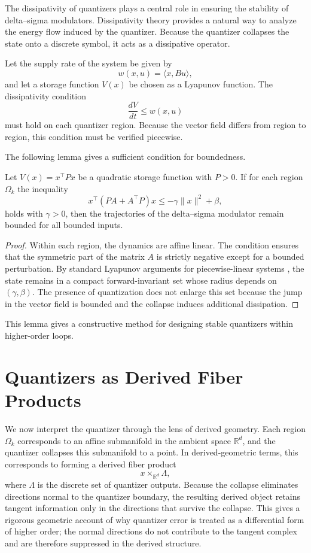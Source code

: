 The dissipativity of quantizers plays a central role in ensuring the stability of delta--sigma modulators. Dissipativity theory \parencite{Willems1972Dissipative,Vidyasagar1993NonlinearSystems} provides a natural way to analyze the energy flow induced by the quantizer. Because the quantizer collapses the state onto a discrete symbol, it acts as a dissipative operator.

Let the supply rate of the system be given by
\[
w(x,u) = \langle x, Bu \rangle,
\]
and let a storage function $V(x)$ be chosen as a Lyapunov function. The dissipativity condition
\[
\frac{dV}{dt} \leq w(x,u)
\]
must hold on each quantizer region. Because the vector field differs from region to region, this condition must be verified piecewise.

The following lemma gives a sufficient condition for boundedness.

\begin{lemma}
Let $V(x) = x^\top P x$ be a quadratic storage function with $P > 0$. If for each region $\Omega_k$ the inequality
\[
x^\top (P A + A^\top P) x \leq -\gamma \|x\|^2 + \beta,
\]
holds with $\gamma > 0$, then the trajectories of the delta--sigma modulator remain bounded for all bounded inputs.
\end{lemma}

\begin{proof}
Within each region, the dynamics are affine linear. The condition ensures that the symmetric part of the matrix $A$ is strictly negative except for a bounded perturbation. By standard Lyapunov arguments for piecewise-linear systems \parencite{Khalil2002Nonlinear}, the state remains in a compact forward-invariant set whose radius depends on $(\gamma,\beta)$. The presence of quantization does not enlarge this set because the jump in the vector field is bounded and the collapse induces additional dissipation.
\end{proof}

This lemma gives a constructive method for designing stable quantizers within higher-order loops.

\section{Quantizers as Derived Fiber Products}

We now interpret the quantizer through the lens of derived geometry. Each region $\Omega_k$ corresponds to an affine submanifold in the ambient space $\mathbb{R}^d$, and the quantizer collapses this submanifold to a point. In derived-geometric terms, this corresponds to forming a derived fiber product
\[
x \times_{\mathbb{R}^d} \Lambda,
\]
where $\Lambda$ is the discrete set of quantizer outputs. Because the collapse eliminates directions normal to the quantizer boundary, the resulting derived object retains tangent information only in the directions that survive the collapse. This gives a rigorous geometric account of why quantizer error is treated as a differential form of higher order; the normal directions do not contribute to the tangent complex and are therefore suppressed in the derived structure.

